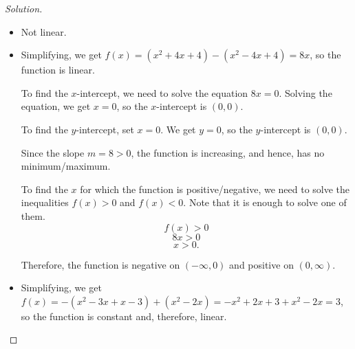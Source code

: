 \documentclass[12pt]{article}
\newenvironment{solution}{\begin{proof}[Solution]}{\end{proof}}
\begin{document}
\begin{enumerate}
\begin{solution}
\begin{itemize}
				
				
				\item[(b)] Not linear.
				\item[(c)] 	Simplifying, we get $f(x)=(x^2+4x+4)-(x^2-4x+4)=8x$, so the function is linear.
				
				To find the $x$-intercept, we need to solve the equation $8x=0$. Solving the equation, we get $x=0$, so the $x$-intercept is $(0,0)$.
				
				To find the $y$-intercept, set $x=0$. We get $y=0$, so the $y$-intercept is $(0,0)$. 
				
				Since the slope $m=8>0$, the function is increasing, and hence, has no minimum/maximum.
				
				To find the $x$ for which the function is positive/negative, we need to solve the inequalities $f(x)>0$ and $f(x)<0$. Note that it is enough to solve one of them.
				$$f(x)>0$$
				$$8x>0$$
				$$x>0.$$
				
				Therefore, the function is negative on $(-\infty,0)$ and positive on $(0,\infty)$.
				
				\item[(d)] 
					Simplifying, we get $f(x)=-(x^2-3x+x-3)+(x^2-2x)=-x^2+2x+3+x^2-2x=3$, so the function is constant and, therefore, linear.
					

\end{itemize}
\end{solution}
\end{enumerate}
\end{document}
